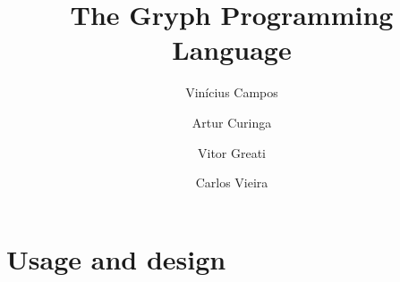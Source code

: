 \documentclass{article}
\title{The Gryph Programming Language}
\author{Vinícius Campos \and Artur Curinga \and Vitor Greati \and Carlos Vieira}
\begin{document}
\maketitle


\tableofcontents

\newpage



\section{Usage and design}
\label{sec:usage}








\end{document}
